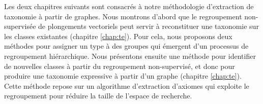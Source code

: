 Les deux chapitres suivants sont consacrés à notre méthodologie d'extraction de taxonomie à partir de graphes. Nous montrons d'abord que le regroupement non-supervisée de plongements vectoriels peut servir à reconstituer une taxonomie sur les classes existantes (chapitre \ref{chap:te}). Pour cela, nous proposons deux méthodes pour assigner un type à des groupes qui émergent d'un processus de regroupement hiérarchique. 
Nous présentons ensuite une méthode pour identifier de nouvelles classes à partir du regroupement non-supervisé, et donc pour produire une taxonomie expressive à partir d'un graphe (chapitre \ref{chap:te}). Cette méthode repose sur un algorithme d'extraction d'axiomes qui exploite le regroupement pour réduire la taille de l'espace de recherche.




\clearpage